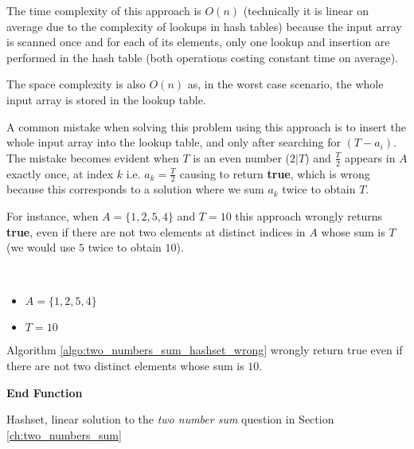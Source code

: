 

The time complexity of this approach is $O(n)$ (technically it is linear on average due to the complexity of lookups in hash tables) because the input array is scanned once and for each
of its elements, only one lookup and insertion are performed in the hash table (both operations costing constant time on average).

The space complexity
is also $O(n)$ as, in the worst case scenario,  the whole input array is stored in the lookup table.

A common mistake when solving this problem using this approach is to insert the whole input array into the lookup table, and only after searching for $(T-a_i)$.
The mistake becomes evident when $T$ is an even number ($2 | T$) and $\frac{T}{2}$ appears in $A$  exactly once, at index $k$ i.e. $a_k = \frac{T}{2}$ causing  to return \textbf{true}, which is wrong because this corresponds to a solution where we sum $a_k$ twice to obtain $T$.

For instance, when $A=\{1,2,5,4\}$ and $T=10$ this approach wrongly returns \textbf{true}, even if there are not two elements at distinct indices in $A$ whose sum is $T$ (we would use $5$ twice to obtain $10$).
\begin{example}
	\hfill \\ 
	\begin{itemize}
		\item[] $A=\{1,2,5,4\}$
	\item[] $T = 10$
\end{itemize}
	Algorithm \ref{algo:two_numbers_sum_hashset_wrong} wrongly return true even if there are not two
	distinct elements whose sum is $10$.
\end{example}


\begin{algorithm}
	 
	   
	
	 \textbf{End Function}
		\caption{Hashset, linear solution to the \textit{two number sum} question in Section
		\label{algo:two_numbers_sum_hashset_wrong}
	\ref{ch:two_numbers_sum} }
\end{algorithm}


